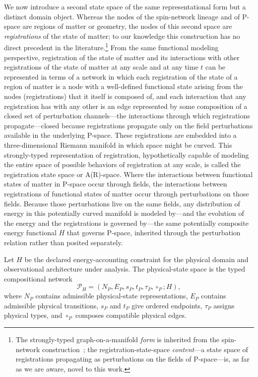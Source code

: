 \documentclass[10pt,twoside,a5paper]{article}
\newcommand{\Pspace}{\ensuremath{\mathcal P_H}}
\theoremstyle{definition}
\begin{document}
We now introduce a second state space of the same representational
form but a distinct domain object. Whereas the nodes of the
spin-network lineage and of P-space are regions of matter or geometry,
the nodes of this second space are \emph{registrations} of the state
of matter; to our knowledge this construction has no direct precedent
in the literature.\footnote{The strongly-typed graph-on-a-manifold
\emph{form} is inherited from the spin-network
construction~\cite{penrose1971spin, rovelli1995spin}; the
registration-state-space \emph{content}---a state space of
registrations propagating as perturbations on the fields of
P-space---is, as far as we are aware, novel to this work.} From the
same functional modeling perspective, registration of the state of
matter and its interactions with other registrations of the state of
matter at any scale and at any time $t$ can be represented in terms of
a network in which each registration of the state of a region of
matter is a node with a well-defined functional state arising from the
nodes (registrations) that it itself is composed of, and each
interaction that any registration has with any other is an edge
represented by some composition of a closed set of perturbation
channels---the interactions through which registrations
propagate---closed because registrations propagate only on the field
perturbations available in the underlying P-space. These registrations
are embedded into a three-dimensional Riemann manifold in which space
might be curved. This strongly-typed representation of registration,
hypothetically capable of modeling the entire space of possible
behaviors of registration at any scale, is called the registration
state space or A(R)-space. Where the interactions between functional
states of matter in P-space occur through fields, the interactions
between registrations of functional states of matter occur through
perturbations on those fields. Because those perturbations live on the
same fields, any distribution of energy in this potentially curved
manifold is modeled by---and the evolution of the energy and the
registrations is governed by---the same potentially composite energy
functional $H$ that governs P-space, inherited through the
perturbation relation rather than posited separately.

Let $H$ be the declared energy-accounting constraint for the physical domain and
observational architecture under analysis. The physical-state space is the typed
compositional network
\begin{equation}
\Pspace=(N_P,E_P,s_P,t_P,\tau_P,\circ_P;H),
\label{eq:physical-space}
\end{equation}
where $N_P$ contains admissible physical-state representations, $E_P$ contains
admissible physical transitions, $s_P$ and $t_P$ give ordered endpoints,
$\tau_P$ assigns physical types, and $\circ_P$ composes compatible physical edges.
\end{document}
